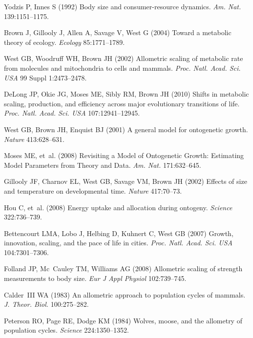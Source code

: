 \documentclass{pnastwo}
\begin{document}
\begin{article}
{\begin{thebibliography}{10}
Yodzis P, Innes S
\newblock (1992) {Body size and consumer-resource dynamics}.
\newblock \emph{Am. Nat.} 139:1151--1175.

Brown J, Gillooly J, Allen A, Savage V, West G
\newblock (2004) {Toward a metabolic theory of ecology}.
\newblock \emph{Ecology} 85:1771--1789.

West GB, Woodruff WH, Brown JH
\newblock (2002) {Allometric scaling of metabolic rate from molecules and
  mitochondria to cells and mammals.}
\newblock \emph{Proc. Natl. Acad. Sci. USA} 99 Suppl 1:2473--2478.

DeLong JP, Okie JG, Moses ME, Sibly RM, Brown JH
\newblock (2010) {Shifts in metabolic scaling, production, and efficiency
  across major evolutionary transitions of life}.
\newblock \emph{Proc. Natl. Acad. Sci. USA} 107:12941--12945.

West GB, Brown JH, Enquist BJ
\newblock (2001) {A general model for ontogenetic growth}.
\newblock \emph{Nature} 413:628--631.

Moses ME, {et~al.}
\newblock (2008) {Revisiting a Model of Ontogenetic Growth: Estimating Model
  Parameters from Theory and Data.}
\newblock \emph{Am. Nat.} 171:632--645.

Gillooly JF, Charnov EL, West GB, Savage VM, Brown JH
\newblock (2002) {Effects of size and temperature on developmental time}.
\newblock \emph{Nature} 417:70--73.

Hou C, {et~al.}
\newblock (2008) {Energy uptake and allocation during ontogeny}.
\newblock \emph{Science} 322:736--739.

Bettencourt LMA, Lobo J, Helbing D, Kuhnert C, West GB
\newblock (2007) {Growth, innovation, scaling, and the pace of life in cities}.
\newblock \emph{Proc. Natl. Acad. Sci. USA} 104:7301--7306.

Folland JP, Mc~Cauley TM, Williams AG
\newblock (2008) {Allometric scaling of strength measurements to body size}.
\newblock \emph{Eur J Appl Physiol} 102:739--745.

Calder~III WA
\newblock (1983) {An allometric approach to population cycles of mammals}.
\newblock \emph{J. Theor. Biol.} 100:275--282.

Peterson RO, Page RE, Dodge KM
\newblock (1984) {Wolves, moose, and the allometry of population cycles}.
\newblock \emph{Science} 224:1350--1352.


\end{thebibliography}}
\end{article}
\end{document}
